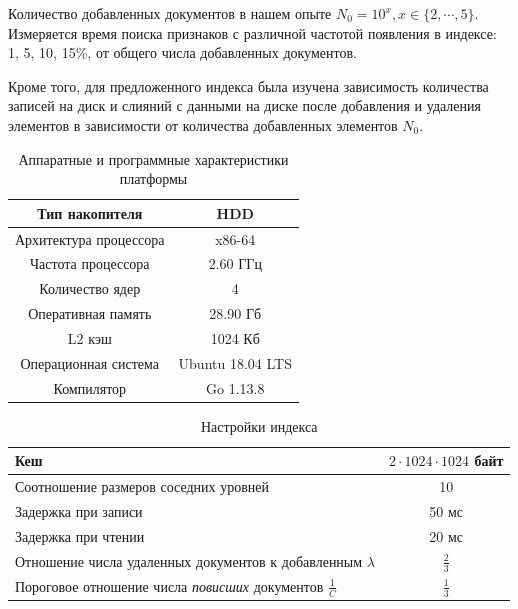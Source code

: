 Количество добавленных документов в нашем опыте $N_0 = 10^{x}, x \in \{2, \cdots, 5\}$.
Измеряется время поиска признаков с различной частотой появления в индексе: 1,
5, 10, 15\%, от общего числа добавленных документов.

Кроме того, для предложенного индекса была изучена зависимость количества
записей на диск и слияний с данными на диске после добавления и удаления элементов
в зависимости от количества добавленных элементов $N_0$.

\begin{table}[H]
\caption{Аппаратные и программные характеристики платформы}
\centering
\small
\singlespacing
\begin{tabular}{|c|c|}
      \hline
      Тип накопителя         & HDD              \\ \hline
      Архитектура процессора & x86-64           \\ \hline
      Частота процессора     & $2.60$ ГГц       \\ \hline
      Количество ядер        & 4                \\ \hline
      Оперативная память     & 28.90 Гб         \\ \hline
      L2 кэш                 & 1024 Кб          \\ \hline
      Операционная система   & Ubuntu 18.04 LTS \\ \hline
      Компилятор             & Go 1.13.8        \\ \hline
\end{tabular}
\end{table}

\begin{table}[H]
      \caption{Настройки индекса}
      \centering
      \small
      \singlespacing
      \begin{tabular}{|l|c|}
            \hline
            Кеш                                                                           & $2\cdot 1024\cdot 1024$ байт \\ \hline
            Соотношение размеров соседних уровней                                         & 10               \\ \hline
            Задержка при записи                                                           & 50 мс            \\ \hline
            Задержка при чтении                                                           & 20 мс            \\ \hline
            Отношение числа удаленных документов к добавленным $\lambda$                  & $\frac{2}{3}$    \\ \hline
            Пороговое отношение числа \textit{повисших} документов $\frac{1}{C}$          & $\frac{1}{3}$    \\ \hline
\end{tabular}
\end{table}

